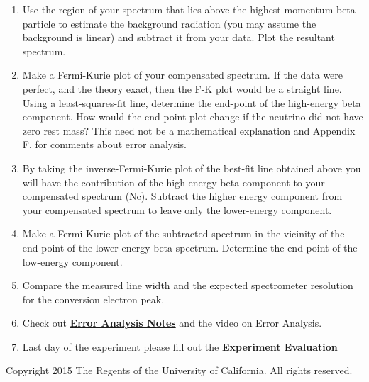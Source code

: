 \documentclass{../lab}
\begin{document}
\begin{enumerate}
\begin{enumerate}
        \item Use the region of your spectrum that lies above the highest-momentum beta-particle to estimate the background radiation (you may assume the background is linear) and subtract it from your data. Plot the resultant spectrum.

        \item Make a Fermi-Kurie plot of your compensated spectrum. If the data were perfect, and the theory exact, then the F-K plot would be a straight line. Using a least-squares-fit line, determine the end-point of the high-energy beta component. How would the end-point plot change if the neutrino did not have zero rest mass? This need not be a mathematical explanation and Appendix F, for comments about error analysis.

        \item By taking the inverse-Fermi-Kurie plot of the best-fit line obtained above you will have the contribution of the high-energy beta-component to your compensated spectrum (Nc). Subtract the higher energy component from your compensated spectrum to leave only the lower-energy component.

        \item Make a Fermi-Kurie plot of the subtracted spectrum in the vicinity of the end-point of the lower-energy beta spectrum. Determine the end-point of the low-energy component.

        \item Compare the measured line width and the expected spectrometer resolution for the conversion electron peak.

        \item Check out \href{\ErrorAnalysisNotes}{\textbf{\textbf{Error Analysis Notes}}} and the video on Error Analysis.

        \item Last day of the experiment please fill out the \href{\ExperimentEvaluation}{\textbf{Experiment Evaluation}}

    \end{enumerate}

\end{enumerate}

Copyright 2015 The Regents of the University of California. All rights reserved.
\end{document}
